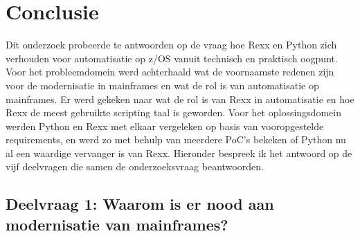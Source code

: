 
\chapter{Conclusie}%
\label{ch:conclusie}


Dit onderzoek probeerde te antwoorden op de vraag hoe Rexx en Python zich verhouden voor automatisatie op z/OS vanuit technisch en praktisch oogpunt. Voor het probleemdomein werd achterhaald wat de voornaamste redenen zijn voor de modernisatie in mainframes en wat de rol is van automatisatie op mainframes. Er werd gekeken naar wat de rol is van Rexx in automatisatie en hoe Rexx de meest gebruikte scripting taal is geworden. Voor het oplossingsdomein werden Python en Rexx met elkaar vergeleken op basis van vooropgestelde requirements, en werd zo met behulp van meerdere PoC's bekeken of Python nu al een waardige vervanger is van Rexx. Hieronder bespreek ik het antwoord op de vijf deelvragen die samen de onderzoeksvraag beantwoorden.

\section{Deelvraag 1: Waarom is er nood aan modernisatie van mainframes?}

